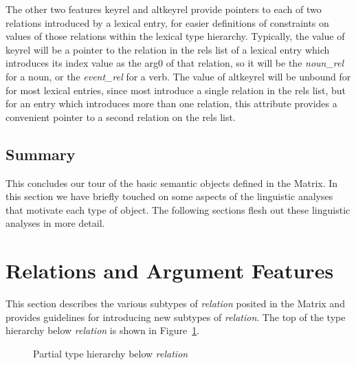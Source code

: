 \documentclass[12pt]{article}
\begin{document}
The other two features {\sc {-}{-}keyrel} and {\sc {-}{-}altkeyrel} provide
pointers to each of two relations introduced by a lexical entry, for easier
definitions of constraints on values of those relations within the lexical
type hierarchy.  Typically, the value of {\sc {-}{-}keyrel} will be a pointer
to the relation in the {\sc rels} list of a lexical entry which introduces
its {\sc index} value as the {\sc arg0} of that relation, so it will be
the {\it noun\_rel} for a noun, or the {\it event\_rel} for a verb.  The value of
{\sc {-}{-}altkeyrel} will be unbound for for most lexical entries, since
most introduce a single relation in the {\sc rels} list, but for
an entry which introduces more than one relation, this attribute provides
a convenient pointer to a second relation on the {\sc rels} list.


\subsection{Summary}

This concludes our tour of the basic semantic objects defined in the
Matrix.   In this section we have briefly touched on some aspects
of the linguistic analyses that motivate each type of object.  The
following sections flesh out these linguistic analyses in more detail.

\section{Relations and Argument Features}
\label{relarg}

This section describes the various subtypes of {\it relation} posited
in the Matrix and provides guidelines for introducing new subtypes of
{\it relation}.  The top of the type hierarchy below {\it relation}
is shown in Figure~\ref{relhier}.

\begin{figure}[ht]
\begin{center}
{\it
\begin{tree}
\end{tree}
}
\end{center}
\caption{Partial type hierarchy below {\it relation}}
\label{relhier}
\end{figure}
\end{document}
